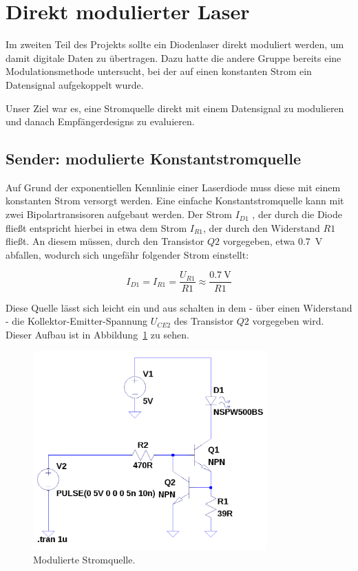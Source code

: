 \documentclass[12pt,a4paper]{article}
\begin{document}
\section{Direkt modulierter Laser}
Im zweiten Teil des Projekts sollte ein Diodenlaser direkt moduliert werden, um damit digitale Daten zu übertragen. Dazu hatte die andere Gruppe bereits eine Modulationsmethode untersucht, bei der auf einen konstanten Strom ein Datensignal aufgekoppelt wurde.

Unser Ziel war es, eine Stromquelle direkt mit einem Datensignal zu modulieren und danach Empfängerdesigns zu evaluieren.


\subsection{Sender: modulierte Konstantstromquelle}
\label{sec:direct_tx}
Auf Grund der exponentiellen Kennlinie einer Laserdiode muss diese mit einem konstanten Strom versorgt werden. Eine einfache Konstantstromquelle kann mit zwei Bipolartransisoren aufgebaut werden. Der Strom $I_{D1}$ , der durch die Diode fließt entspricht hierbei in etwa dem Strom $I_{R1}$, der durch den Widerstand $R1$ fließt. An diesem müssen, durch den Transistor  $Q2$ vorgegeben, etwa \SI{0.7}{\volt} abfallen, wodurch sich ungefähr folgender Strom einstellt:

\begin{equation}
I_{D1} = I_{R1} = \frac{U_{R1}}{R1} \approx \frac{\SI{0.7}{\volt}}{R1}
\end{equation}

Diese Quelle lässt sich leicht ein und aus schalten in dem - über einen Widerstand - die Kollektor-Emitter-Spannung $U_{CE2}$ des Transistor $Q2$ vorgegeben wird. Dieser Aufbau ist in Abbildung~\ref{fig:modulated_current_source} zu sehen.

\begin{figure}[H]
  \centering
    \includegraphics[width=0.8\textwidth]{../spice/modulated_current_source.png}
  \caption{Modulierte Stromquelle.}
  \label{fig:modulated_current_source}
\end{figure}
\end{document}
